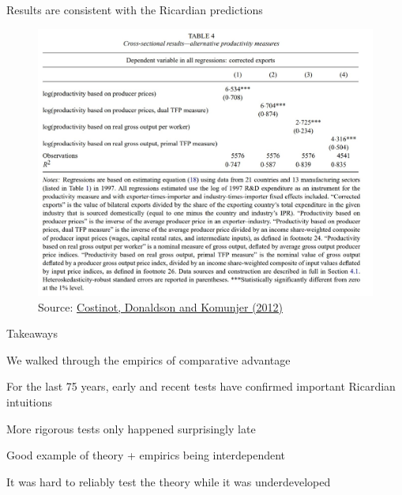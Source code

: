 \documentclass[notes,11pt, aspectratio=169, xcolor=table]{beamer}
\newenvironment{wideitemize}{\itemize\addtolength{\itemsep}{10pt}}{\enditemize}
\begin{document}
\begin{frame}{Results are consistent with the Ricardian predictions}
    \begin{figure}
        \centering
        \includegraphics[width=0.6\linewidth]{figs/cdk2.jpg}
        \caption{Source: \href{https://academic.oup.com/restud/article/79/2/581/1532037}{Costinot, Donaldson and Komunjer (2012)} }
        \label{fig:cdk2}
    \end{figure}
\end{frame}

\begin{frame}{Takeaways}
\begin{wideitemize}
    \item We walked through the empirics of comparative advantage

    \item For the last 75 years, early and recent tests have confirmed important Ricardian intuitions

    \item More rigorous tests only happened surprisingly late

    \item Good example of theory + empirics being interdependent

    \item It was hard to reliably test the theory while it was underdeveloped
\end{wideitemize}
\end{frame}
\end{document}
